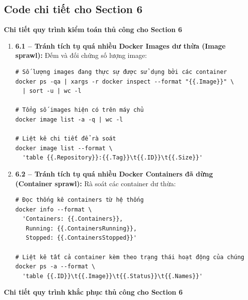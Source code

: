 \subsection{Code chi tiết cho Section 6}\label{phu-luc-code-section-6}

\noindent\textbf{Chi tiết quy trình kiểm toán thủ công cho Section 6}

\begin{enumerate}
    \item \textbf{6.1 -- Tránh tích tụ quá nhiều Docker Images dư thừa (Image sprawl):}
    Đếm và đối chứng số lượng image:
{\footnotesize
\begin{verbatim}
# Số lượng images đang thực sự được sử dụng bởi các container
docker ps -qa | xargs -r docker inspect --format "{{.Image}}" \
  | sort -u | wc -l

# Tổng số images hiện có trên máy chủ
docker image list -a -q | wc -l

# Liệt kê chi tiết để rà soát
docker image list --format \
  'table {{.Repository}}:{{.Tag}}\t{{.ID}}\t{{.Size}}'
\end{verbatim}
}

    \item \textbf{6.2 -- Tránh tích tụ quá nhiều Docker Containers đã dừng (Container sprawl):}
    Rà soát các container dư thừa:
{\scriptsize
\begin{verbatim}
# Đọc thống kê containers từ hệ thống
docker info --format \
  'Containers: {{.Containers}},
   Running: {{.ContainersRunning}},
   Stopped: {{.ContainersStopped}}'

# Liệt kê tất cả container kèm theo trạng thái hoạt động của chúng
docker ps -a --format \
  'table {{.ID}}\t{{.Image}}\t{{.Status}}\t{{.Names}}'
\end{verbatim}
}
\end{enumerate}

\noindent\textbf{Chi tiết quy trình khắc phục thủ công cho Section 6}

